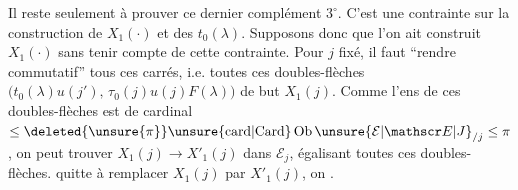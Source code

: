 Il reste seulement à prouver ce dernier complément $3^\circ$. C'est une contrainte  sur la construction de $X_1(\cdot)$ et des $t_0(\lambda)$. Supposons donc que l'on ait construit $X_1(\cdot)$ sans tenir compte de cette contrainte. Pour $j$ fixé, il faut  ``rendre commutatif'' tous ces carrés, i.e. toutes ces doubles-flèches $\bigl(t_0(\lambda)u(j'),\,\tau_0(j)u(j)F(\lambda)\bigr)$ de but $X_1(j)$. Comme l'ens de ces doubles-flèches est de cardinal $\leq\deleted{\unsure{\pi}}\unsure{\mathrm{card}|\mathrm{Card}}\operatorname{Ob}\unsure{\mathcal E|\mathscr E|J}_{/j}\leq\pi$, on peut trouver $X_1(j)\longrightarrow X'_1(j)$ dans $\mathcal E_j$, égalisant toutes ces doubles-flèches.  quitte à remplacer $X_1(j)$ par $X'_1(j)$, on .
